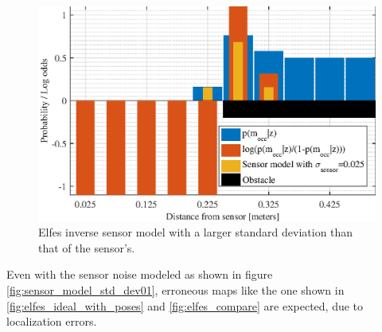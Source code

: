 \begin{figure}
	\centering
	\includegraphics[scale=1.0]{figures/static_mapping/sensor_model_std_dev025}
	\caption{Elfes inverse sensor model with a larger standard deviation than that of the sensor's.}
	\label{fig:sensor_model_std_dev025}
\end{figure}

Even with the sensor noise modeled as shown in figure \ref{fig:sensor_model_std_dev01}, erroneous maps like the one shown in \ref{fig:elfes_ideal_with_poses} and \ref{fig:elfes_compare} are expected, due to localization errors.


